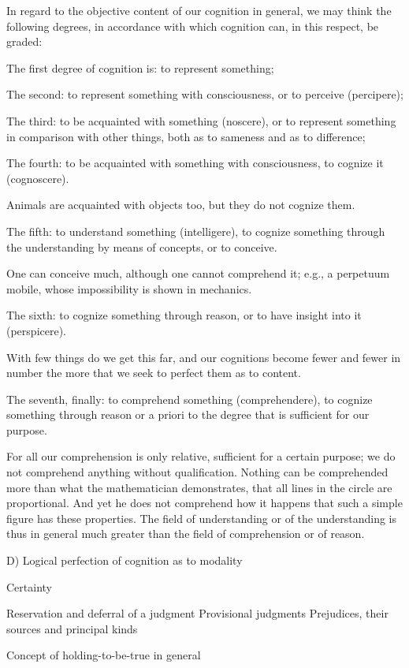 In regard to the objective content of our cognition in general,
we may think the following degrees, in accordance with which
cognition can, in this respect, be graded:

The first degree of cognition is: to represent something;

The second: to represent something with consciousness,
or to perceive (percipere);

The third: to be acquainted with something (noscere), or
to represent something in comparison with other things,
both as to sameness and as to difference;

The fourth: to be acquainted with something with consciousness,
to cognize it (cognoscere).

Animals are acquainted with objects too, but they do not cognize them.

The fifth: to understand something (intelligere),
to cognize something through the understanding by means of concepts,
or to conceive.

One can conceive much, although one cannot comprehend it;
e.g., a perpetuum mobile, whose impossibility is shown in mechanics.

The sixth: to cognize something through reason, or
to have insight into it (perspicere).

With few things do we get this far,
and our cognitions become fewer and fewer in number
the more that we seek to perfect them as to content.

The seventh, finally: to comprehend something (comprehendere),
to cognize something through reason or a priori
to the degree that is sufficient for our purpose.

For all our comprehension is only relative,
sufficient for a certain purpose;
we do not comprehend anything without qualification.
Nothing can be comprehended more than what the mathematician demonstrates,
that all lines in the circle are proportional.
And yet he does not comprehend how it happens that such a simple
figure has these properties.
The field of understanding or of the understanding is thus in general
much greater than the field of comprehension or of reason.

D) Logical perfection of cognition as to modality

Certainty

    Reservation and deferral of a judgment
    Provisional judgments
    Prejudices, their sources and principal kinds

Concept of holding-to-be-true in general

